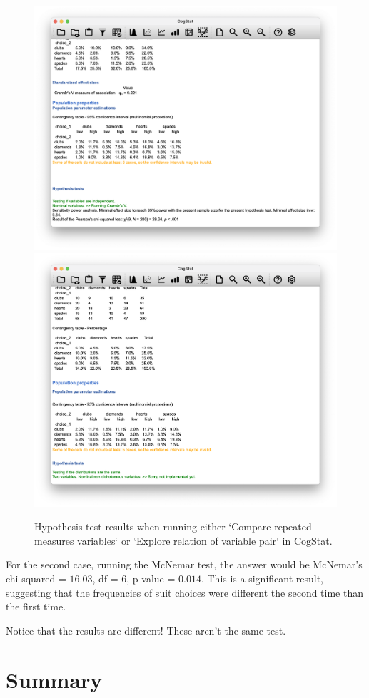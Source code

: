 \documentclass[
]{book}
\theoremstyle{definition}
\theoremstyle{definition}
\theoremstyle{definition}
\theoremstyle{definition}
\theoremstyle{remark}
\begin{document}
\begin{figure}

{\centering \includegraphics[width=0.66\linewidth]{resources/image/cogstatmcn1} \includegraphics[width=0.66\linewidth]{resources/image/cogstatmcn2} 

}

\caption{Hypothesis test results when running either `Compare repeated measures variables` or `Explore relation of variable pair` in CogStat.}\label{fig:cogstatmcn}
\end{figure}

For the second case, running the McNemar test, the answer would be McNemar's chi-squared = \(16.03\), df = \(6\), p-value = \(0.014\). This is a significant result, suggesting that the frequencies of suit choices were different the second time than the first time.

Notice that the results are different! These aren't the same test.

\hypertarget{summary-5}{%
\section{Summary}\label{summary-5}}
\end{document}

